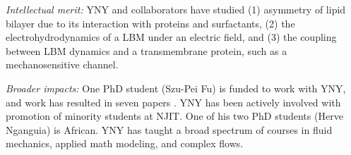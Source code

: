 \documentclass[11pt]{article}
\begin{document}
\noindent
{\it Intellectual merit:} YNY and collaborators have studied (1) asymmetry of lipid bilayer due to its interaction with proteins and surfactants, 
(2) the electrohydrodynamics of a LBM under an electric field, and
(3) the coupling between LBM dynamics and a transmembrane protein, such as a mechanosensitive channel. 

\noindent
{\it Broader impacts:} 
One PhD student (Szu-Pei Fu) is 
funded to work with YNY, and work has resulted in seven papers
\cite{Nganguia2013_PoF,Nganguia2013_PRE,Young2014_JFM,Young2015_PoF,Nganguia2015_CiCP,Pak2015,Fu2015_PRE}.
YNY has been actively involved with promotion of minority students at NJIT. 
One of his two PhD students (Herve Nganguia) is African. YNY has taught a broad
spectrum of courses in fluid mechanics, applied math modeling, and complex flows.

%
%


\newpage

%



\end{document}
